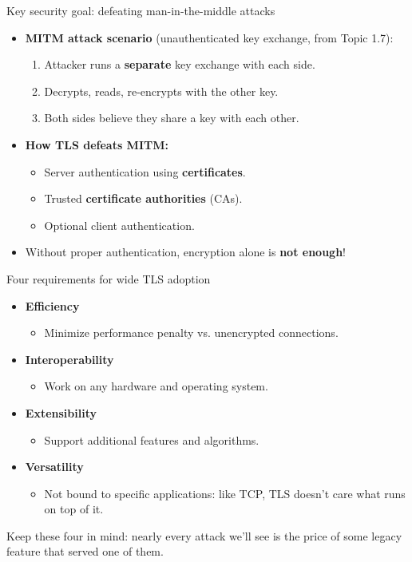 \ifdefined\PRESENTATION\else\PassOptionsToClass{handout}{beamer}\fi\documentclass[aspectratio=169, lualatex]{beamer}
\begin{document}
\begin{frame}{Key security goal: defeating man-in-the-middle attacks}
	\begin{itemize}[<+->]
		\item \textbf{MITM attack scenario} (unauthenticated key exchange, from Topic 1.7):
		      \begin{enumerate}
			      \item Attacker runs a \textbf{separate} key exchange with each side.
			      \item Decrypts, reads, re-encrypts with the other key.
			      \item Both sides believe they share a key with each other.
		      \end{enumerate}
		\item \textbf{How TLS defeats MITM:}
		      \begin{itemize}
			      \item Server authentication using \textbf{certificates}.
			      \item Trusted \textbf{certificate authorities} (CAs).
			      \item Optional client authentication.
		      \end{itemize}
		\item Without proper authentication, encryption alone is \textbf{not enough}!
	\end{itemize}
\end{frame}

\begin{frame}{Four requirements for wide TLS adoption}
	\begin{itemize}[<+->]
		\item \textbf{Efficiency}
		      \begin{itemize}
			      \item Minimize performance penalty vs. unencrypted connections.
		      \end{itemize}
		\item \textbf{Interoperability}
		      \begin{itemize}
			      \item Work on any hardware and operating system.
		      \end{itemize}
		\item \textbf{Extensibility}
		      \begin{itemize}
			      \item Support additional features and algorithms.
		      \end{itemize}
		\item \textbf{Versatility}
		      \begin{itemize}
			      \item Not bound to specific applications: like TCP, TLS doesn't care what runs on top of it.
		      \end{itemize}
	\end{itemize}
	\pause
	\begin{center}
		Keep these four in mind: nearly every attack we'll see is the price of some legacy feature that served one of them.
	\end{center}
\end{frame}
\end{document}
